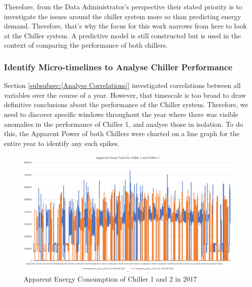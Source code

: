 \documentclass[12pt]{scrartcl}
\begin{document}
Therefore, from the Data Administrator's perspective their stated priority is to investigate the issues around the chiller system more so than predicting energy demand. Therefore, that's why the focus for this work narrows from here to look at the Chiller system. A predictive model is still constructed but is used in the context of comparing the performance of both chillers. 



\subsubsection{Identify Micro-timelines to Analyse Chiller Performance}
\label{subsubsec:[Identify Micro-timelines to Analyse Chiller Performance]}

Section \ref{subsubsec:[Analyse Correlations]} investigated correlations between all variables over the course of a year. However, that timescale is too broad to draw definitive conclusions about the performance of the Chiller system. Therefore, we need to discover specific windows throughout the year where there was visible anomalies in the performance of Chiller 1, and analyse those in isolation. To do this, the Apparent Power of both Chillers were charted on a line graph for the entire year to identify any such spikes. 

\begin{figure}[h]
  \caption{Apparent Energy Consumption of Chiller 1 and 2 in 2017}
  \label{fig:energyconsumptionchiller12}
  \centering
    \includegraphics[scale=0.50]{energyconsumptionchiller12}
\end{figure} 
\end{document}
